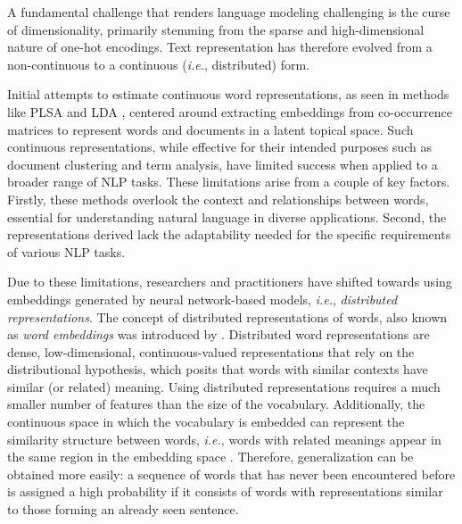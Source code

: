 A fundamental challenge that renders language modeling challenging is the curse of dimensionality, primarily stemming from the sparse and high-dimensional nature of one-hot encodings. Text representation has therefore evolved from a non-continuous to a continuous (\textit{i.e.}, distributed) form.

Initial attempts to estimate continuous word representations, as seen in methods like \ac{PLSA} \citep{hofmann2001unsupervised} and \ac{LDA} \citep{blei2003latent}, centered around extracting embeddings from co-occurrence matrices to represent words and documents in a latent topical space. Such continuous representations, while effective for their intended purposes such as document clustering and term analysis, have limited success when applied to a broader range of \ac{NLP} tasks. These limitations arise from a couple of key factors. Firstly, these methods overlook the context and relationships between words, essential for understanding natural language in diverse applications. Second, the representations derived lack the adaptability needed for the specific requirements of various \ac{NLP} tasks.


Due to these limitations, researchers and practitioners have shifted towards using embeddings generated by neural network-based models, \textit{i.e.}, \textit{distributed representations}. The concept of distributed representations of words, also known as \textit{word embeddings} was introduced by \citet{bengio2000neural}. Distributed word representations are dense, low-dimensional, continuous-valued representations that rely on the distributional hypothesis, which posits that words with similar contexts have similar (or related) meaning. Using distributed representations requires a much smaller number of features than the size of the vocabulary. Additionally, the continuous space in which the vocabulary is embedded can represent the similarity structure between words, \textit{i.e.}, words with related meanings appear in the same region in the embedding space \citep{shazeer2016swivel}. Therefore, generalization can be obtained more easily: a sequence of words that has never been encountered before is assigned a high probability if it consists of words with representations similar to those forming an already seen sentence. 

